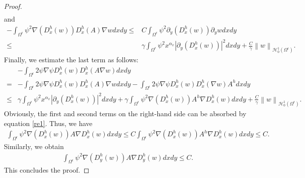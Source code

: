 \documentclass[9pt,reqno]{amsart}
\theoremstyle{plain}
\numberwithin{equation}{section}
\numberwithin{theorem}{section}
\def\Om{\Omega}
\def\Om{\Omega}
\begin{document}
\begin{proof}
\begin{equation*}
\begin{split}
			\end{split}
		\end{equation*}
		and
		\begin{equation*}
			\begin{split}
				-\int_{\Om^{\epsilon}}\psi^2 \nabla (D_x^h (w)) D_x^{h}(A) \nabla w dxdy \le& 
				C\int_{\Om^{\epsilon}}\psi^2 \partial_{y} (D_x^h (w))  \partial_{y} w dxdy\\
				\le& \gamma \int_{\Om^{\epsilon}} \psi^2 x^{\alpha_x} |\partial_{y} (D_x^h (w))|^2 dxdy + \frac{C}{\gamma} \left\| w\right\|_{\mathcal{H}_0^1(\Om^{\epsilon})}.
			\end{split}
		\end{equation*}
		Finally, we estimate the last term as follows:
		\begin{equation*}
			\begin{split}
				&-\int_{\Om^{\epsilon}}  2\psi \nabla \psi D_x^h (w) D_x^{h}(A\nabla w) dxdy\\
				=&-\int_{\Om^{\epsilon}}  2\psi \nabla \psi D_x^h (w) D_x^{h}(A)\nabla w dxdy
				-\int_{\Om^{\epsilon}}  2\psi \nabla \psi D_x^h (w) D_x^{h}(\nabla w)A^h dxdy\\
				\le&  \gamma \int_{\Om^{\epsilon}} \psi^2 x^{\alpha_x} |\partial_{y} (D_x^h (w))|^2 dxdy 
				+\gamma \int_{\Om^{\epsilon}} \psi^2 \nabla (D_x^h (w)) A^h \nabla D_x^h (w)  dxdy+ \frac{C}{\gamma} \left\| w\right\|_{\mathcal{H}_0^1(\Om^{\epsilon})}.
			\end{split}
		\end{equation*}
		Obviously, the first and second terms on the right-hand side can be absorbed by equation \eqref{re1}. Thus, we have 
		\begin{equation*}
			\begin{split}
				\int_{\Om^{\epsilon}} \psi^2 \nabla (D_x^h (w)) A\nabla D_x^h (w)  dxdy\le C\int_{\Om^{\epsilon}} \psi^2 \nabla (D_x^h (w)) A^h \nabla D_x^h (w)  dxdy\le C.
			\end{split}
		\end{equation*}
		Similarly, we obtain
		\begin{equation*}
			\begin{split}
				\int_{\Om^{\epsilon}} \psi^2 \nabla (D_y^h (w)) A\nabla D_y^h (w)  dxdy \le C.
			\end{split}
		\end{equation*}
		This concludes the proof.
	\end{proof}
\end{document}

